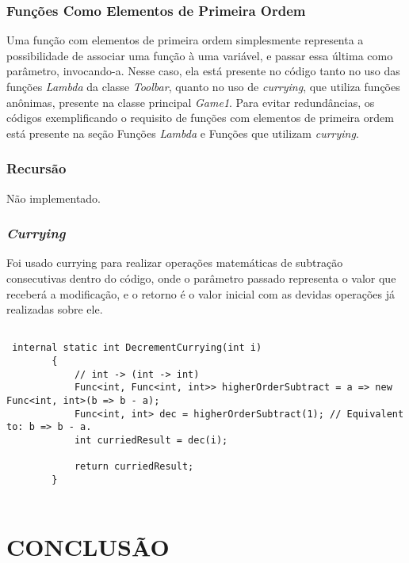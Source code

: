 \documentclass[rel_mlp]{iiufrgs}
\begin{document}
\subsection{Funções Como Elementos de Primeira Ordem}

Uma função com elementos de primeira ordem simplesmente representa a possibilidade de associar uma função à uma variável, e passar essa última como parâmetro, invocando-a. Nesse caso, ela está presente no código tanto no uso das funções \textit{Lambda} da classe \textit{Toolbar}, quanto no uso de \textit{currying}, que utiliza funções anônimas, presente na classe principal \textit{Game1}. Para evitar redundâncias, os códigos exemplificando o requisito de funções com elementos de primeira ordem está presente na seção Funções \textit{Lambda} e Funções que utilizam \textit{currying}.

\subsection{Recursão}

Não implementado.

\subsection{\textit{Currying}}

Foi usado currying para realizar operações matemáticas de subtração consecutivas dentro do código, onde o parâmetro passado representa o valor que receberá a modificação, e o retorno é o valor inicial com as devidas operações já realizadas sobre ele.

\begin{lstlisting}[caption=Trecho de código C\# retirado da implementação deste trabalho, label=lst:test]

 internal static int DecrementCurrying(int i)
        {
            // int -> (int -> int) 
            Func<int, Func<int, int>> higherOrderSubtract = a => new Func<int, int>(b => b - a);
            Func<int, int> dec = higherOrderSubtract(1); // Equivalent to: b => b - a.
            int curriedResult = dec(i);

            return curriedResult;
        }


\end{lstlisting}



%
\chapter{CONCLUSÃO}
\end{document}
